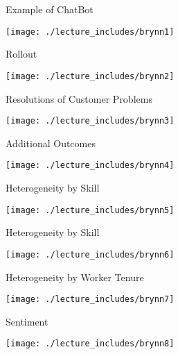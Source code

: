 \documentclass{beamer}
\begin{document}
\begin{frame}{Example of ChatBot}
\begin{center}
\texttt{[image: ./lecture\_includes/brynn1]}
\end{center}
\end{frame}


\begin{frame}{Rollout}
\begin{center}
\texttt{[image: ./lecture\_includes/brynn2]}
\end{center}
\end{frame}


\begin{frame}{Resolutions of Customer Problems}
\begin{center}
\texttt{[image: ./lecture\_includes/brynn3]}
\end{center}
\end{frame}


\begin{frame}{Additional Outcomes}
\begin{center}
\texttt{[image: ./lecture\_includes/brynn4]}
\end{center}
\end{frame}

\begin{frame}{Heterogeneity by Skill}
\begin{center}
\texttt{[image: ./lecture\_includes/brynn5]}
\end{center}
\end{frame}


\begin{frame}{Heterogeneity by Skill}
\begin{center}
\texttt{[image: ./lecture\_includes/brynn6]}
\end{center}
\end{frame}

\begin{frame}{Heterogeneity by Worker Tenure}
\begin{center}
\texttt{[image: ./lecture\_includes/brynn7]}
\end{center}
\end{frame}



\begin{frame}{Sentiment}
\begin{center}
\texttt{[image: ./lecture\_includes/brynn8]}
\end{center}
\end{frame}
\end{document}
